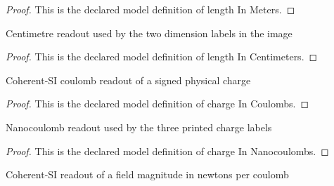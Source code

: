 \begin{proof}
  This is the declared model definition of length In Meters.
\end{proof}
\begin{definition}
  \label{def:physics:phyx-mini-0834:phyxminiproblems-problemphyxmini0834-lengthincentimeters}
  Centimetre readout used by the two dimension labels in the image
\end{definition}
\begin{proof}
  This is the declared model definition of length In Centimeters.
\end{proof}
\begin{definition}
  \label{def:physics:phyx-mini-0834:phyxminiproblems-problemphyxmini0834-chargeincoulombs}
  Coherent-SI coulomb readout of a signed physical charge
\end{definition}
\begin{proof}
  This is the declared model definition of charge In Coulombs.
\end{proof}
\begin{definition}
  \label{def:physics:phyx-mini-0834:phyxminiproblems-problemphyxmini0834-chargeinnanocoulombs}
  Nanocoulomb readout used by the three printed charge labels
\end{definition}
\begin{proof}
  This is the declared model definition of charge In Nanocoulombs.
\end{proof}
\begin{definition}
  \label{def:physics:phyx-mini-0834:phyxminiproblems-problemphyxmini0834-fieldmagnitudeinnewtonspercoulomb}
  Coherent-SI readout of a field magnitude in newtons per coulomb
\end{definition}
